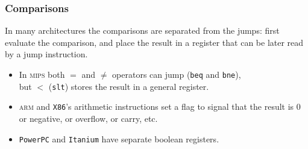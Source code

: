 \documentclass{beamer}
\newcommand{\emp}[1]{\textcolor{DikuRed}{ #1}}
\begin{document}
\begin{frame}[fragile,t]
   \frametitle{Comparisons}

\bigskip

In many architectures the comparisons are separated from the jumps:
\emp{first evaluate the comparison, and place the result in a register that
can be later read by a jump instruction.}


\bigskip

\begin{itemize}

    \item In \textsc{mips} both $=$ and $\not=$ operators can jump ({\tt beq} and {\tt bne}),\\ 
        but $<$ ({\tt slt}) stores the result in a general register.\bigskip

    \item \textsc{arm} and {\tt X86}'s arithmetic instructions set a \emp{flag} 
            to signal that the result is $0$ or negative, or overflow, or carry, etc.\bigskip

    \item {\tt PowerPC} and {\tt Itanium} have \emp{separate boolean registers}.\bigskip

\end{itemize}

\end{frame}
\end{document}
